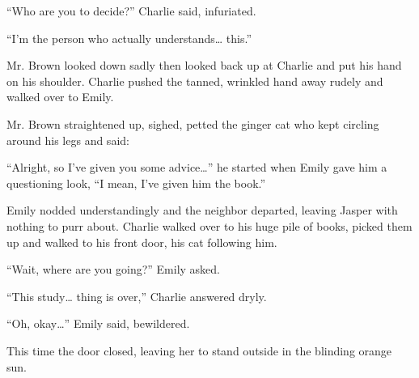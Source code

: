 “Who are you to decide?” Charlie said, infuriated.

“I’m the person who actually understands… this.”

Mr. Brown looked down sadly then looked back up at Charlie and put his hand on his shoulder. Charlie pushed the tanned, wrinkled hand away rudely and walked over to Emily.

Mr. Brown straightened up, sighed, petted the ginger cat who kept circling around his legs and said:

“Alright, so I’ve given you some advice…” he started when Emily gave him a questioning look, “I mean, I’ve given him the book.”

Emily nodded understandingly and the neighbor departed, leaving Jasper with nothing to purr about. Charlie walked over to his huge pile of books, picked them up and walked to his front door, his cat following him.

“Wait, where are you going?” Emily asked.

“This study… thing is over,” Charlie answered dryly.

“Oh, okay…” Emily said, bewildered.

This time the door closed, leaving her to stand outside in the blinding orange sun.